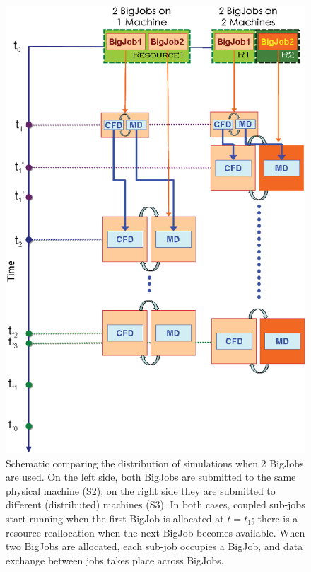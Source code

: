\documentclass[conference,final]{IEEEtran}
\begin{document}
\begin{figure}
  \centering \includegraphics[scale=0.40]{Simulation_Time_of_Two_BigJobs.eps} \caption{\small
    Schematic comparing the distribution of simulations when 2 BigJobs
    are used. On the left side, both BigJobs are submitted to the same
    physical machine (S2); on the right side they are submitted to
    different (distributed) machines (S3). In both cases, coupled
    sub-jobs start running when the first BigJob is allocated at
    $t=t_1$; there is a resource reallocation when the next BigJob
    becomes available. When two BigJobs are allocated, each sub-job
    occupies a BigJob, and data exchange between jobs takes place
    across BigJobs.}  \label{Fig:TwoBigJobs} \end{figure}
\end{document}
